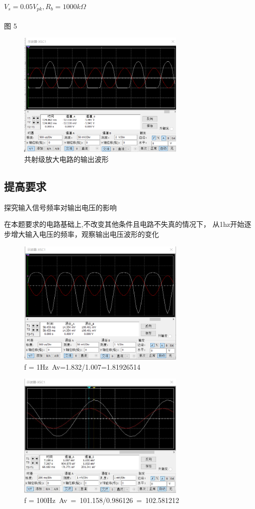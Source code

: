 \documentclass[10pt, conference, compsocconf, a4paper]{IEEEtran}
\begin{document}
\paragraph{$V_{s} = 0.05V_{pk} , R_b = 1000k\Omega$}图 5

\begin{figure}[h]
  \includegraphics[width=8cm]{img/d.png}
  \caption{共射级放大电路的输出波形}
  \label{共射级放大电路的输出波形}
\end{figure}



\subsection{提高要求}
探究输入信号频率对输出电压的影响\par
在本题要求的电路基础上,不改变其他条件且电路不失真的情况下，
从1hz开始逐步增大输入电压的频率，观察输出电压波形的变化
\begin{figure}[h]
  \includegraphics[width=8cm]{img/e.png}
  \caption{f = 1Hz Av=1.832/1.007=1.81926514}
\end{figure}

\begin{figure}[h]
  \includegraphics[width=8cm]{img/f.png}
  \caption{f = 100Hz Av = 101.158/0.986126 = 102.581212}
\end{figure}
\end{document}
